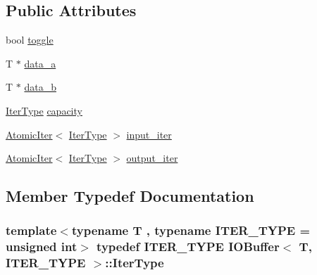 \subsection*{Public Attributes}
\begin{DoxyCompactItemize}
\item 
bool \hyperlink{structIOBuffer_a31e25c6353b67da4d9e523de7e4f502b}{toggle}
\item 
T $\ast$ \hyperlink{structIOBuffer_a64e70fb67768e01a6620bc8ad7964ab0}{data\-\_\-a}
\item 
T $\ast$ \hyperlink{structIOBuffer_a3c49c40193c6906e051eb89b128ab00f}{data\-\_\-b}
\item 
\hyperlink{structIOBuffer_ab4571677106318f7fd246c9536292354}{Iter\-Type} \hyperlink{structIOBuffer_a185b9d6fdaa3f937f5b97d18ae813c08}{capacity}
\item 
\hyperlink{structAtomicIter}{Atomic\-Iter}$<$ \hyperlink{structIOBuffer_ab4571677106318f7fd246c9536292354}{Iter\-Type} $>$ \hyperlink{structIOBuffer_a76c5930fc902839c06f6dc78b4ad9556}{input\-\_\-iter}
\item 
\hyperlink{structAtomicIter}{Atomic\-Iter}$<$ \hyperlink{structIOBuffer_ab4571677106318f7fd246c9536292354}{Iter\-Type} $>$ \hyperlink{structIOBuffer_aff9c8b064ee173136abd76ff4cbc1e50}{output\-\_\-iter}
\end{DoxyCompactItemize}


\subsection{Member Typedef Documentation}
\hypertarget{structIOBuffer_ab4571677106318f7fd246c9536292354}{
\subsubsection[{Iter\-Type}]{\setlength{\rightskip}{0pt plus 5cm}template$<$typename T , typename I\-T\-E\-R\-\_\-\-T\-Y\-P\-E  = unsigned int$>$ typedef I\-T\-E\-R\-\_\-\-T\-Y\-P\-E {\bf I\-O\-Buffer}$<$ T, I\-T\-E\-R\-\_\-\-T\-Y\-P\-E $>$\-::{\bf Iter\-Type}}}\label{structIOBuffer_ab4571677106318f7fd246c9536292354}



